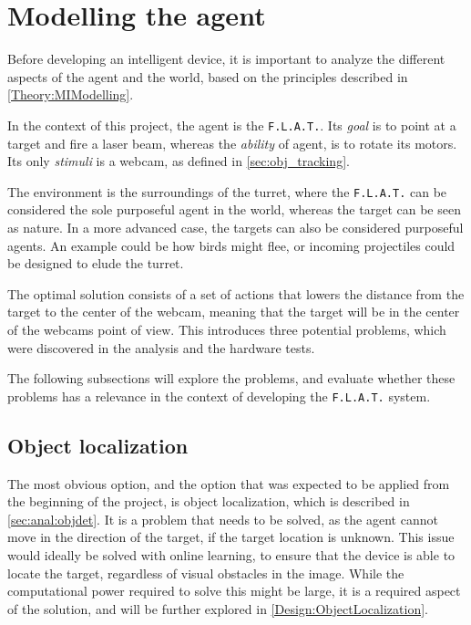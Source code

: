 \section{Modelling the agent}\label{Design:MI}
Before developing an intelligent device, it is important to analyze the different aspects of the agent and the world, based on the principles described in \autoref{Theory:MIModelling}.


In the context of this project, the agent is the \texttt{F.L.A.T.}.
Its \textit{goal} is to point at a target and fire a laser beam, whereas the \textit{ability} of agent, is to rotate its motors.
Its only \textit{stimuli} is a webcam, as defined in \autoref{sec:obj_tracking}.

The environment is the surroundings of the turret, where the \texttt{F.L.A.T.} can be considered the sole purposeful agent in the world, whereas the target can be seen as nature.
In a more advanced case, the targets can also be considered purposeful agents.
An example could be how birds might flee, or incoming projectiles could be designed to elude the turret.

The optimal solution consists of a set of actions that lowers the distance from the target to the center of the webcam, meaning that the target will be in the center of the webcams point of view.
This introduces three potential problems, which were discovered in the analysis and the hardware tests.

The following subsections will explore the problems, and evaluate whether these problems has a relevance in the context of developing the \texttt{F.L.A.T.} system. 


\subsection{Object localization}

The most obvious option, and the option that was expected to be applied from the beginning of the project, is object localization, which is described in \autoref{sec:anal:objdet}.
It is a problem that needs to be solved, as the agent cannot move in the direction of the target, if the target location is unknown.
This issue would ideally be solved with online learning, to ensure that the device is able to locate the target, regardless of visual obstacles in the image.
While the computational power required to solve this might be large, it is a required aspect of the solution, and will be further explored in \autoref{Design:ObjectLocalization}.

